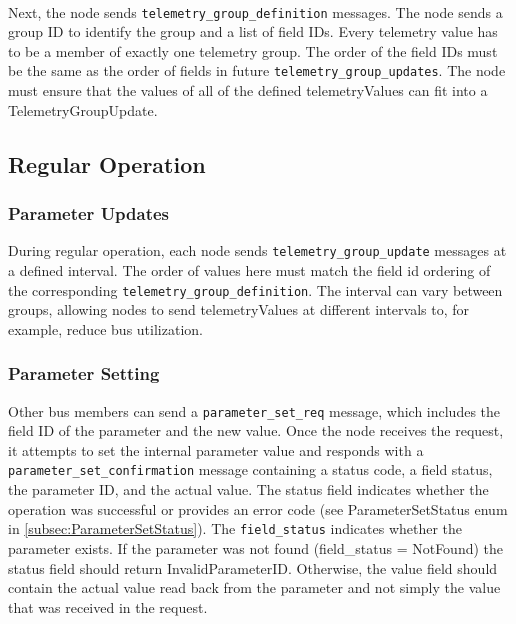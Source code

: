 \paragraph{}
Next, the node sends \texttt{telemetry\_group\_definition} messages.
The node sends a group ID to identify the group and a list of field IDs. 
Every telemetry value has to be a member of exactly one telemetry group.
The order of the field IDs must be the same as the order of fields in future \texttt{telemetry\_group\_updates}. The node must ensure that the values of all of the defined telemetryValues can fit into a TelemetryGroupUpdate.


\subsection{Regular Operation}\label{subsec:regular-operation}
\subsubsection{Parameter Updates}\label{subsubsec:parameter-updates}
During regular operation, each node sends \texttt{telemetry\_group\_update} messages at a defined interval. The order of values here must match the field id ordering of the corresponding \texttt{telemetry\_group\_definition}.
The interval can vary between groups, allowing nodes to send telemetryValues at different intervals to, for example, reduce bus utilization.

\subsubsection{Parameter Setting}\label{subsubsec:parameter-setting}
Other bus members can send a \texttt{parameter\_set\_req} message, which includes the field ID of the parameter and the new value.
Once the node receives the request, it attempts to set the internal parameter value and responds with a \texttt{parameter\_set\_confirmation} message containing a status code, a field status, the parameter ID, and the actual value. The status field indicates whether the operation was successful or provides an error code (see ParameterSetStatus enum in \ref{subsec:ParameterSetStatus}). The \texttt{field\_status} indicates whether the parameter exists. If the parameter was not found (field\_status = NotFound) the status field should return InvalidParameterID. Otherwise, the value field should contain the actual value read back from the parameter and not simply the value that was received in the request.


